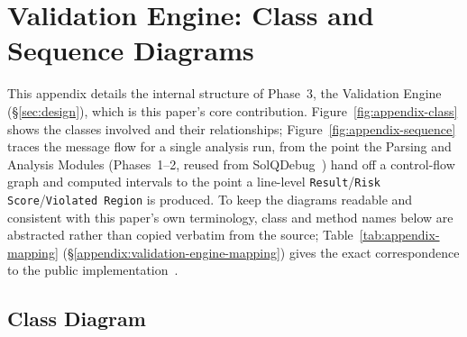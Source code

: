 \documentclass[pdflatex,sn-basic]{sn-jnl}%
\theoremstyle{thmstyleone}%
\theoremstyle{thmstyletwo}%
\theoremstyle{thmstylethree}%
\begin{document}
\section{Validation Engine: Class and Sequence Diagrams}
\label{appendix:validation-engine}

This appendix details the internal structure of Phase~3, the Validation Engine (\S\ref{sec:design}), which is this paper's core contribution. Figure~\ref{fig:appendix-class} shows the classes involved and their relationships; Figure~\ref{fig:appendix-sequence} traces the message flow for a single analysis run, from the point the Parsing and Analysis Modules (Phases~1--2, reused from SolQDebug~\citep{solqdebug}) hand off a control-flow graph and computed intervals to the point a line-level \texttt{Result}/\texttt{Risk Score}/\texttt{Violated Region} is produced. To keep the diagrams readable and consistent with this paper's own terminology, class and method names below are abstracted rather than copied verbatim from the source; Table~\ref{tab:appendix-mapping} (\S\ref{appendix:validation-engine-mapping}) gives the exact correspondence to the public implementation~\citep{intentchecker}.

\subsection{Class Diagram}
\label{appendix:validation-engine-class}
\end{document}
